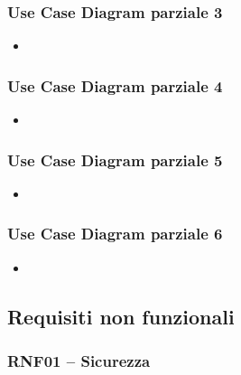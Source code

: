\documentclass[italian,11pt,a4paper]{article}
\begin{document}
\subsubsection{Use Case Diagram parziale 3}
\begin{itemize}
\item
\end{itemize}
\begin{figure}[H]\centering
{}
\caption{}
\end{figure}

\subsubsection{Use Case Diagram parziale 4}
\begin{itemize}
\item
\end{itemize}
\begin{figure}[H]\centering
{}
\caption{}
\end{figure}

\subsubsection{Use Case Diagram parziale 5}
\begin{itemize}
\item
\end{itemize}
\begin{figure}[H]\centering
{}
\caption{}
\end{figure}

\subsubsection{Use Case Diagram parziale 6}
\begin{itemize}
\item
\end{itemize}
\begin{figure}[H]\centering
{}
\caption{}
\end{figure}

\newpage
\subsection{Requisiti non funzionali}
\subsubsection{RNF01 -- Sicurezza}
\end{document}
